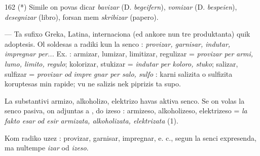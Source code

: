 \begin{VUpage}[166]{162}
{(*) Simile on povas dicar \textit{bavizar} (D. \textit{begeifern}), \textit{vomizar} (D.\nl
\textit{bespeien}), \textit{desegnizar} (libro), forsan mem \textit{skribizar} (papero).%
}

 --- Ta sufixo Greka, Latina, internaciona (ed ankore\nl
nun tre produktanta) quik adoptesis. Ol soldesas a radiki\nl
kun la senco : \textit{provizar, garnisar, indutar, impregnar per...}\nl
Ex. : armizar, lumizar, limitizar, regulizar = \textit{provizar per}\nl
\textit{armi, lumo, limito, regulo}; kolorizar, stukizar = \textit{indutar}\nl
\textit{per koloro, stuko}; salizar, sulfizar = \textit{provizar od impre}\cc
\textit{gnar per salo, sulfo} : karni salizita o sulfizita koruptesas\nl
min rapide; vu ne salizis nek piprizis ta supo.

La substantivi armizo, alkoholizo, elektrizo havas aktiva\nl
senco. Se on volas la senco pasiva, on adjuntas  a , do\nl
izeso : armizeso, alkoholizeso, elektrizeso = \textit{la fakto esar}\nl
\textit{od esir armizata, alkoholizata, elektrizata} (1).

Kom radiko uzez : provizar, garnisar, impregnar, e. c.,\nl
segun la senci expresenda, ma nultempe \textit{izar} od \textit{izeso}.
\end{VUpage}

